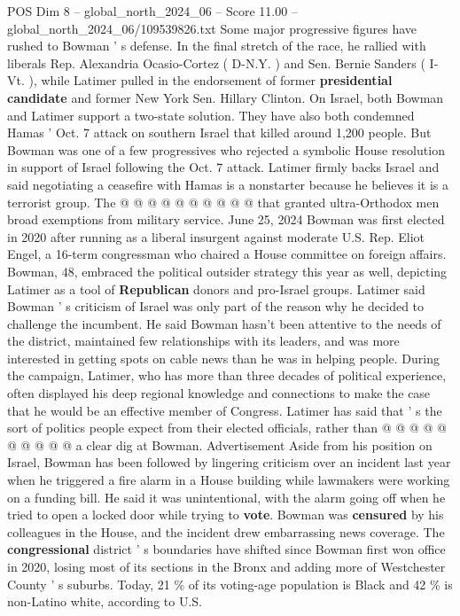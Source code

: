 \begin{textsample}{POS Dim 8 – global\_north\_2024\_06 – Score 11.00 – global\_north\_2024\_06/109539826.txt}
Some major progressive figures have rushed to Bowman ' s defense.
In the final stretch of the race, he rallied with liberals Rep.
Alexandria Ocasio-Cortez ( D-N.Y. ) and Sen.
Bernie Sanders ( I-Vt. ), while Latimer pulled in the endorsement of former \textbf{presidential} \textbf{candidate} and former New York Sen.
Hillary Clinton.
On Israel, both Bowman and Latimer support a two-state solution.
They have also both condemned Hamas ' Oct. 7 attack on southern Israel that killed around 1,200 people.
But Bowman was one of a few progressives who rejected a symbolic House resolution in support of Israel following the Oct. 7 attack.
Latimer firmly backs Israel and said negotiating a ceasefire with Hamas is a nonstarter because he believes it is a terrorist group.
The @ @ @ @ @ @ @ @ @ @ that granted ultra-Orthodox men broad exemptions from military service.
June 25, 2024 Bowman was first elected in 2020 after running as a liberal insurgent against moderate U.S.
Rep.
Eliot Engel, a 16-term congressman who chaired a House committee on foreign affairs.
Bowman, 48, embraced the political outsider strategy this year as well, depicting Latimer as a tool of \textbf{Republican} donors and pro-Israel groups.
Latimer said Bowman ' s criticism of Israel was only part of the reason why he decided to challenge the incumbent.
He said Bowman hasn't been attentive to the needs of the district, maintained few relationships with its leaders, and was more interested in getting spots on cable news than he was in helping people.
During the campaign, Latimer, who has more than three decades of political experience, often displayed his deep regional knowledge and connections to make the case that he would be an effective member of Congress.
Latimer has said that ' s the sort of politics people expect from their elected officials, rather than @ @ @ @ @ @ @ @ @ @ a clear dig at Bowman.
Advertisement Aside from his position on Israel, Bowman has been followed by lingering criticism over an incident last year when he triggered a fire alarm in a House building while lawmakers were working on a funding bill.
He said it was unintentional, with the alarm going off when he tried to open a locked door while trying to \textbf{vote}.
Bowman was \textbf{censured} by his colleagues in the House, and the incident drew embarrassing news coverage.
The \textbf{congressional} district ' s boundaries have shifted since Bowman first won office in 2020, losing most of its sections in the Bronx and adding more of Westchester County ' s suburbs.
Today, 21 \% of its voting-age population is Black and 42 \% is non-Latino white, according to U.S.

\end{textsample}
